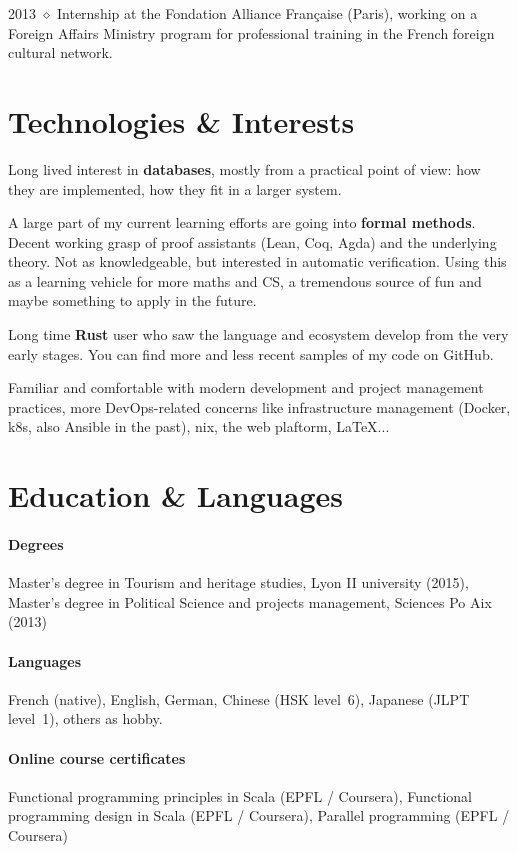 \documentclass[10pt]{article}
\newcommand{\setparskip}{\setlength{\parskip}{.3em}}
\begin{document}
\hfill
\begin{minipage}[t]{0.42\textwidth}
  \setparskip

  2013 $\diamond$ Internship at the Fondation Alliance Française (Paris), working on a
  Foreign Affairs Ministry program for professional training in the French
  foreign cultural network.

  \section*{Technologies \& Interests}

  Long lived interest in \textbf{databases}, mostly from a practical point of
  view: how they are implemented, how they fit in a larger system.

  A large part of my current learning efforts are going into \textbf{formal
    methods}. Decent working grasp of proof assistants (Lean, Coq, Agda) and the
  underlying theory.  Not as knowledgeable, but interested in automatic
  verification. Using this as a learning vehicle for more maths and CS, a
  tremendous source of fun and maybe something to apply in the future.

  Long time \textbf{Rust} user who saw the language and ecosystem develop
  from the very early stages. You can find more and less recent samples of my
  code on GitHub.

  Familiar and comfortable with modern development and project management
  practices, more DevOps-related concerns like infrastructure management
  (Docker, k8s, also Ansible in the past), nix, the web plaftorm, \LaTeX...

  \section*{Education \& Languages}

  \paragraph{Degrees} Master's degree in Tourism and heritage studies, Lyon II university (2015), Master's degree in Political Science and projects management, Sciences Po Aix (2013)

  \vspace{-1em}

  \paragraph{Languages} French (native), English, German, Chinese (HSK level~6), Japanese (JLPT level~1), others as hobby.

  \vspace{-1em}

  \paragraph{Online course certificates} Functional programming principles in Scala (EPFL / Coursera), Functional programming design in Scala (EPFL / Coursera), Parallel programming (EPFL / Coursera)

\end{minipage}
\end{document}
